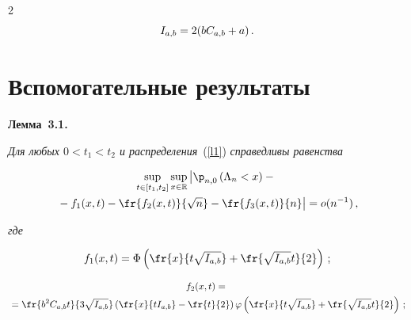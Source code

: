 \begin{multicols}{2}
$$


\iab = 2(b\cab+a)\,.


$$





\section{Вспомогательные результаты}





\noindent


\textbf{Лемма~3.1.}


{\it Для любых $0 < t_1 < t_2$ и распределения}~(\ref{l1}) \textit{справедливы равенства}


\begin{multline*}


\sup_{t\in[t_1,t_2]} \sup_{x \in {\mathbb{R}}} 


 \left| \vphantom{\fr{f_2(x)}{\sqrt{n}}}


 {\p}_{n, 0}\left(\Lambda_n < x\right) -{}\right.\\


\left. {}- f_1(x,t)


- \fr{f_2(x,t)}{\sqrt{n}} - \fr{f_3(x,t)}{n}\right| = o(n^{-1})\,,


\end{multline*}


\textit{где}


$$


f_1(x,t) = {\Phi}\left(\fr{x}{t\sqrt{I_{a,b}}} + \fr{\sqrt{I_{a,b}}t}{2}\right)\,;


$$





\noindent


\begin{multline*}


f_2(x,t) ={}\\


{}= \fr{b^2C_{a,b}t}{3\sqrt{I_{a,b}}}\left(\fr{x}{tI_{a,b}} - 


\fr{t}{2}\right) \varphi\left(\fr{x}{t\sqrt{I_{a,b}}} + \fr{\sqrt{I_{a,b}}t}{2}\right)\,;


\end{multline*}





\noindent


\begin{multline*}



\end{multline*}
\end{multicols}
